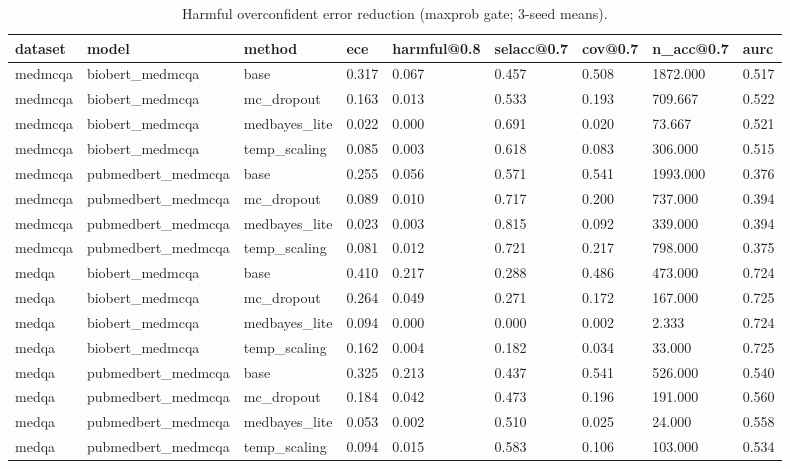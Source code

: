 \begin{table}[htbp]
\centering
\caption{Harmful overconfident error reduction (maxprob gate; 3-seed means).}
\label{tab:rev_table8_maxprob_gate}
\begin{tabular}{lllllllll}
\toprule
dataset & model & method & ece & harmful@0.8 & selacc@0.7 & cov@0.7 & n\_acc@0.7 & aurc \\
\midrule
medmcqa & biobert\_medmcqa & base & 0.317 & 0.067 & 0.457 & 0.508 & 1872.000 & 0.517 \\
medmcqa & biobert\_medmcqa & mc\_dropout & 0.163 & 0.013 & 0.533 & 0.193 & 709.667 & 0.522 \\
medmcqa & biobert\_medmcqa & medbayes\_lite & 0.022 & 0.000 & 0.691 & 0.020 & 73.667 & 0.521 \\
medmcqa & biobert\_medmcqa & temp\_scaling & 0.085 & 0.003 & 0.618 & 0.083 & 306.000 & 0.515 \\
medmcqa & pubmedbert\_medmcqa & base & 0.255 & 0.056 & 0.571 & 0.541 & 1993.000 & 0.376 \\
medmcqa & pubmedbert\_medmcqa & mc\_dropout & 0.089 & 0.010 & 0.717 & 0.200 & 737.000 & 0.394 \\
medmcqa & pubmedbert\_medmcqa & medbayes\_lite & 0.023 & 0.003 & 0.815 & 0.092 & 339.000 & 0.394 \\
medmcqa & pubmedbert\_medmcqa & temp\_scaling & 0.081 & 0.012 & 0.721 & 0.217 & 798.000 & 0.375 \\
medqa & biobert\_medmcqa & base & 0.410 & 0.217 & 0.288 & 0.486 & 473.000 & 0.724 \\
medqa & biobert\_medmcqa & mc\_dropout & 0.264 & 0.049 & 0.271 & 0.172 & 167.000 & 0.725 \\
medqa & biobert\_medmcqa & medbayes\_lite & 0.094 & 0.000 & 0.000 & 0.002 & 2.333 & 0.724 \\
medqa & biobert\_medmcqa & temp\_scaling & 0.162 & 0.004 & 0.182 & 0.034 & 33.000 & 0.725 \\
medqa & pubmedbert\_medmcqa & base & 0.325 & 0.213 & 0.437 & 0.541 & 526.000 & 0.540 \\
medqa & pubmedbert\_medmcqa & mc\_dropout & 0.184 & 0.042 & 0.473 & 0.196 & 191.000 & 0.560 \\
medqa & pubmedbert\_medmcqa & medbayes\_lite & 0.053 & 0.002 & 0.510 & 0.025 & 24.000 & 0.558 \\
medqa & pubmedbert\_medmcqa & temp\_scaling & 0.094 & 0.015 & 0.583 & 0.106 & 103.000 & 0.534 \\
\bottomrule
\end{tabular}
\end{table}
